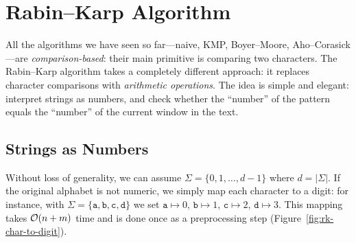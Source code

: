 \section{Rabin--Karp Algorithm}
\label{sec:rabin-karp}

All the algorithms we have seen so far---naive, KMP, Boyer--Moore,
Aho--Corasick---are \emph{comparison-based}: their main primitive is
comparing two characters.
The Rabin--Karp algorithm takes a completely different approach: it
replaces character comparisons with \emph{arithmetic operations}.
The idea is simple and elegant: interpret strings as numbers, and check
whether the ``number'' of the pattern equals the ``number'' of the
current window in the text.


\subsection{Strings as Numbers}

Without loss of generality, we can assume $\Sigma = \{0, 1, \ldots,
d-1\}$ where $d = |\Sigma|$.
If the original alphabet is not numeric, we simply map each character
to a digit: for instance, with $\Sigma = \{\texttt{a}, \texttt{b},
\texttt{c}, \texttt{d}\}$ we set $\texttt{a} \mapsto 0$,
$\texttt{b} \mapsto 1$, $\texttt{c} \mapsto 2$, $\texttt{d} \mapsto 3$.
This mapping takes $\mathcal{O}\!\left(n + m\right)$ time and is done once as a
preprocessing step (Figure~\ref{fig:rk-char-to-digit}).

